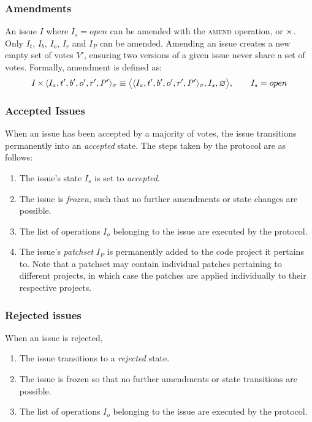 \subsubsection{Amendments}

An issue $I$ where $I_s = open$ can be amended with the \textsc{amend}
operation, or $\operatorname{\times}$. Only $I_t$, $I_b$, $I_o$, $I_r$ and $I_P$ can be
amended.  Amending an issue creates a new empty set of votes $V'$, ensuring two
versions of a given issue never share a set of votes. Formally, amendment is
defined as:
\begin{align*}
    I \operatorname{\times}{} \langle I_a, t', b', o', r', P' \rangle_{\sigma} \equiv
    \big<\langle I_a, t', b', o', r', P' \rangle_{\sigma}, I_s, \varnothing
    \big>, \qquad I_s = open
\end{align*}


\subsubsection{Accepted Issues} When an issue has been accepted by a majority
of votes, the issue transitions permanently into an \emph{accepted} state. The
steps taken by the protocol are as follows:

\begin{enumerate}
    \item The issue's state $I_s$ is set to \emph{accepted}.
    \item The issue is \emph{frozen}, such that no further amendments or state
        changes are possible.
    \item The list of operations $I_o$ belonging to the issue are executed by
        the protocol.
    \item The issue's \emph{patchset} $I_P$ is permanently added to the code
        project it pertains to. Note that a patchset may contain individual
        patches pertaining to different projects, in which case the patches are
        applied individually to their respective projects.
\end{enumerate}

\subsubsection{Rejected issues} When an issue is rejected,
\begin{enumerate}
    \item The issue transitions to a \emph{rejected} state.
    \item The issue is frozen so that no further amendments or state
        transitions are possible.
    \item The list of operations $I_o$ belonging to the issue are executed by
        the protocol.
\end{enumerate}

